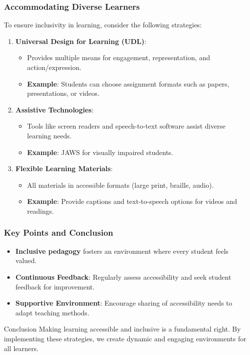 \documentclass[aspectratio=169]{beamer}
\begin{document}
\begin{frame}[fragile]
    \frametitle{Accommodating Diverse Learners}
    To ensure inclusivity in learning, consider the following strategies:
    \begin{enumerate}
        \item \textbf{Universal Design for Learning (UDL)}:
        \begin{itemize}
            \item Provides multiple means for engagement, representation, and action/expression.
            \item \textbf{Example}: Students can choose assignment formats such as papers, presentations, or videos.
        \end{itemize}
        
        \item \textbf{Assistive Technologies}:
        \begin{itemize}
            \item Tools like screen readers and speech-to-text software assist diverse learning needs.
            \item \textbf{Example}: JAWS for visually impaired students.
        \end{itemize}
        
        \item \textbf{Flexible Learning Materials}:
        \begin{itemize}
            \item All materials in accessible formats (large print, braille, audio).
            \item \textbf{Example}: Provide captions and text-to-speech options for videos and readings.
        \end{itemize}
    \end{enumerate}
\end{frame}

\begin{frame}[fragile]
    \frametitle{Key Points and Conclusion}
    \begin{itemize}
        \item \textbf{Inclusive pedagogy} fosters an environment where every student feels valued.
        \item \textbf{Continuous Feedback}: Regularly assess accessibility and seek student feedback for improvement.
        \item \textbf{Supportive Environment}: Encourage sharing of accessibility needs to adapt teaching methods.
    \end{itemize}
    
    \begin{block}{Conclusion}
        Making learning accessible and inclusive is a fundamental right. By implementing these strategies, we create dynamic and engaging environments for all learners.
    \end{block}
\end{frame}
\end{document}
